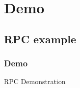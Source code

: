 \section{Demo}
\subsection{RPC example}
\begin{frame}[red] %
\frametitle{Demo}
\begin{center}
\Huge
 RPC Demonstration
\end{center}
\end{frame}